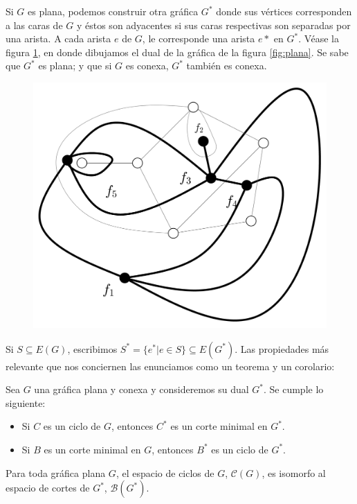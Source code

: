 Si $G$ es plana, podemos construir otra gráfica $G^{*}$ donde sus vértices corresponden a las caras de $G$ y éstos son adyacentes si sus caras respectivas son separadas por una arista. A cada arista $e$ de $G$, le corresponde una arista $e*$ en $G^{*}$. Véase la figura \ref{fig:dual}, en donde dibujamos el dual de la gráfica de la figura \ref{fig:plana}. Se sabe que $G^{*}$ es plana; y que si $G$ es conexa, $G^{*}$ también es conexa.
\begin{figure}[H]
    \centering
    \includegraphics[scale=0.2]{img/imgchapter4/dual.jpg}
    \caption{}
    \label{fig:dual}
\end{figure}

Si $S\subseteq E(G)$, escribimos $S^{*} = \{e^{*} | e\in S\} \subseteq E(G^{*})$. Las propiedades más relevante que nos conciernen las enunciamos como un teorema y un corolario:

\begin{teo}
Sea $G$ una gráfica plana y conexa y consideremos su dual $G^{*}$. Se cumple lo siguiente: 
\begin{itemize}
    \item Si $C$ es un ciclo de $G$, entonces $C^{*}$ es un corte minimal en $G^{*}$.
    \item Si $B$ es un corte minimal en $G$, entonces $B^{*}$ es un ciclo de $G^{*}$.
\end{itemize}
\end{teo}

\begin{cor}
Para toda gráfica plana $G$, el espacio de ciclos de $G$, $\mathcal{C}(G)$, es isomorfo al espacio de cortes de $G^{*}$, $\mathcal{B}(G^{*})$.
\end{cor}

